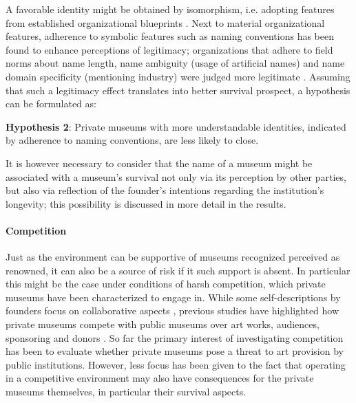 \documentclass[12pt]{article}
\begin{document}
A favorable identity might be obtained by isomorphism, i.e. adopting features from established organizational blueprints \parencite{diMaggio_1983_iron}.
Next to material organizational features, adherence to symbolic features such as naming conventions has been found to enhance perceptions of legitimacy; organizations that adhere to field norms about name length, name ambiguity (usage of artificial names) and name domain specificity (mentioning industry) were judged more legitimate \parencite{Glynn_Abzug_2002_names}.
Assuming that such a legitimacy effect translates into better survival prospect, a hypothesis can be formulated as:


\bigbreak
\noindent
\textbf{Hypothesis 2}: Private museums with more understandable identities, indicated by adherence to naming conventions, are less likely to close. 


It is however necessary to consider that the name of a museum might be associated with a museum's survival not only via its perception by other parties, but also via reflection of the founder's intentions regarding the institution's longevity; this possibility is discussed in more detail in the results.
\paragraph*{Competition}




Just as the environment can be supportive of museums recognized perceived as renowned, it can also be a source of risk if it such support is absent.
In particular this might be the case under conditions of harsh competition, which private museums have been characterized to engage in.
While some self-descriptions by founders focus on collaborative aspects \parencite{Duron_2020_rebaudengo,BMW_2016_salsali}, previous studies have highlighted how private museums compete with public museums over art works, audiences, sponsoring and donors \parencite[p.4]{Kolbe_etal_2022_privatemuseum}. 
So far the primary interest of investigating competition has been to evaluate whether private museums pose a threat to art provision by public institutions.
However, less focus has been given to the fact that operating in a competitive environment may also have consequences for the private museums themselves, in particular their survival aspects.
\end{document}

